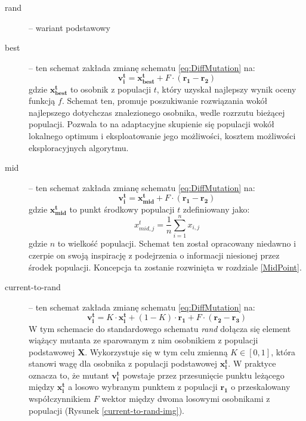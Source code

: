 \documentclass[12pt,a4paper]{report}
\begin{document}
{{{{\begin{description}
\item[rand] \cite{RainerStorn,SpringerIntroToEvol} -- wariant podstawowy
\item[best] \cite{PracticalInsights} -- ten schemat zakłada zmianę schematu \ref{eq:DiffMutation} na:
\begin{equation}
\mathbf{v_i^{t}} = \mathbf{x_{best}^t} + F \cdot (\mathbf{r_{1}} - \mathbf{r_{2}})
\end{equation}
gdzie $\mathbf{x_{best}^t}$ to osobnik z populacji $t$, który uzyskał najlepszy wynik oceny funkcją $f$. Schemat ten, promuje poszukiwanie rozwiązania wokół najlepszego dotychczas znalezionego osobnika, wedle rozrzutu bieżącej populacji. Pozwala to na adaptacyjne skupienie się populacji wokół lokalnego optimum i eksploatowanie jego możliwości, kosztem możliwości eksploracyjnych algorytmu.
\item[mid] \cite{DEmid} -- ten schemat zakłada zmianę schematu \ref{eq:DiffMutation} na:
\begin{equation}
\mathbf{v_i^{t}} = \mathbf{x_{mid}^t} + F \cdot (\mathbf{r_{1}} - \mathbf{r_{2}})
\end{equation}
gdzie $\mathbf{x_{mid}^t}$ to punkt środkowy populacji $t$ zdefiniowany jako:
\begin{equation}
x_{mid,j}^t = \frac{1}{n}\sum_{i=1}^n{x_{i,j}}
\end{equation}
gdzie $n$ to wielkość populacji. Schemat ten został opracowany niedawno i czerpie on swoją inspirację z podejrzenia o informacji niesionej przez środek populacji. Koncepcja ta zostanie rozwinięta w rozdziale \ref{MidPoint}.

\item[current-to-rand] \cite{PracticalInsights} -- ten schemat zakłada zmianę schematu \ref{eq:DiffMutation} na:
\begin{equation}
 \mathbf{v_i^{t}} = K \cdot \mathbf{x_i^t} + (1 - K) \cdot \mathbf{r_{1}} + F \cdot (\mathbf{r_{2}} - \mathbf{r_{3}})
\end{equation}
W tym schemacie do standardowego schematu \emph{rand} dołącza się element wiążący mutanta ze sparowanym z nim osobnikiem z populacji podstawowej $\mathbf{X}$. Wykorzystuje się w tym celu zmienną $K \in [0, 1]$, która stanowi wagę dla osobnika z populacji podstawowej $\mathbf{x_i^t}$. W praktyce oznacza to, że mutant $\mathbf{v_i^t}$ powstaje przez przesunięcie punktu leżącego między $\mathbf{x_i^t}$ a losowo wybranym punktem z populacji $\mathbf{r_1}$ o przeskalowany współczynnikiem $F$ wektor między dwoma losowymi osobnikami z populacji (Rysunek \ref{current-to-rand-img}).


\end{description}}}}}
\end{document}
